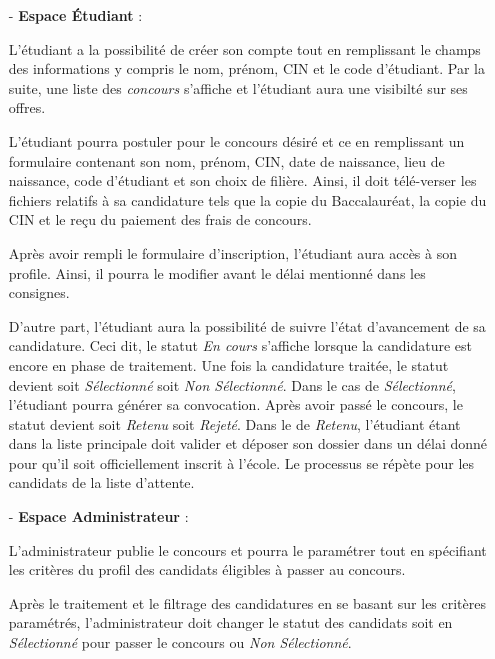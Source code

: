        \begin{itemize}
         \item[-] \textbf{Espace Étudiant} :
         
\setlength{\parindent}{20pt}  
\setlength{\parskip}{1em}

L'étudiant a la possibilité de créer son compte tout en remplissant le champs des informations  y compris le nom, prénom, CIN et le code d'étudiant. Par la suite, une liste des \emph{concours} s'affiche et l'étudiant aura une visibilté sur ses offres.\par 

L'étudiant pourra postuler pour le concours désiré et ce en remplissant un formulaire contenant son nom, prénom, CIN, date de naissance, lieu de naissance, code d'étudiant et son choix de filière. Ainsi, il doit télé-verser les fichiers relatifs à sa candidature tels que la copie du Baccalauréat, la copie du CIN et le reçu du paiement des frais de concours.

Après avoir rempli le formulaire d'inscription, l'étudiant aura accès à son profile. Ainsi, il pourra le modifier avant le délai mentionné dans les consignes.\par

D'autre part, l'étudiant aura la possibilité de suivre l'état d'avancement de sa candidature. Ceci dit, le statut \emph{En cours} s'affiche lorsque la candidature est encore en phase de traitement. Une fois la candidature traitée, le statut devient soit \emph{Sélectionné} soit \emph{Non Sélectionné}. Dans le cas de \emph{Sélectionné}, l'étudiant pourra générer sa convocation. Après avoir passé le concours, le statut devient soit \emph{Retenu} soit \emph{Rejeté}. Dans le de \emph{Retenu}, l'étudiant étant dans la liste principale doit valider et déposer son dossier dans un délai donné pour qu'il soit officiellement inscrit à l'école. Le processus se répète pour les candidats de la liste d'attente.

\item[-] \textbf{Espace Administrateur} :

L'administrateur publie le concours et pourra le paramétrer tout en spécifiant les critères du profil des candidats éligibles à passer au concours.\par 

Après le traitement et le filtrage des candidatures en se basant sur les critères paramétrés, l'administrateur doit changer le statut des candidats soit en \emph{Sélectionné} pour passer le concours ou \emph{Non Sélectionné}.\par


\end{itemize}
